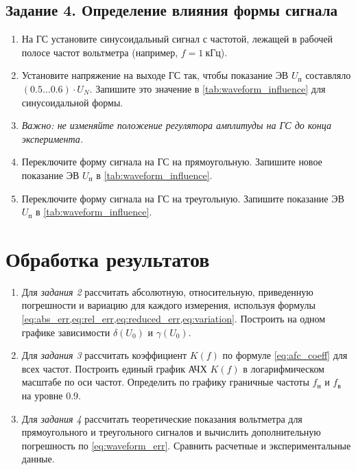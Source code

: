 \subsection*{Задание 4. Определение влияния формы сигнала}
\begin{enumerate}
    \item На ГС установите синусоидальный сигнал с частотой, лежащей в рабочей полосе частот вольтметра (например, $f = 1~\text{кГц}$).
    \item Установите напряжение на выходе ГС так, чтобы показание ЭВ $U_\text{п}$ составляло $(0.5 \dots 0.6) \cdot U_N$. Запишите это значение в \cref{tab:waveform_influence} для синусоидальной формы.
    \item \textit{Важно: не изменяйте положение регулятора амплитуды на ГС до конца эксперимента.}
    \item Переключите форму сигнала на ГС на прямоугольную. Запишите новое показание ЭВ $U_\text{п}$ в \cref{tab:waveform_influence}.
    \item Переключите форму сигнала на ГС на треугольную. Запишите показание ЭВ $U_\text{п}$ в \cref{tab:waveform_influence}.
\end{enumerate}

\section*{Обработка результатов}
\begin{enumerate}
    \item Для \textit{задания 2} рассчитать абсолютную, относительную, приведенную погрешности и вариацию для каждого измерения, используя формулы \cref{eq:abs_err,eq:rel_err,eq:reduced_err,eq:variation}. Построить на одном графике зависимости $\delta(U_0)$ и $\gamma(U_0)$.
    \item Для \textit{задания 3} рассчитать коэффициент $K(f)$ по формуле \cref{eq:afc_coeff} для всех частот. Построить единый график АЧХ $K(f)$ в логарифмическом масштабе по оси частот. Определить по графику граничные частоты $f_\text{н}$ и $f_\text{в}$ на уровне $0.9$.
    \item Для \textit{задания 4} рассчитать теоретические показания вольтметра для прямоугольного и треугольного сигналов и вычислить дополнительную погрешность по \cref{eq:waveform_err}. Сравнить расчетные и экспериментальные данные.
\end{enumerate}

